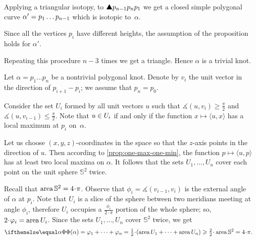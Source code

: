 Applying a triangular isotopy, to $\solidtriangle p_{n-1}p_np_1$ we get a closed simple polygonal curve $\alpha'\z=p_1\dots p_{n-1}$ which is isotopic to~$\alpha$.

Since all the vertices $p_i$ have different heights,
the assumption of the proposition holds for $\alpha'$.

Repeating this procedure $n-3$ times we get a triangle.
Hence $\alpha$ is a trivial knot.
\qeds


Let $\alpha=p_1\dots p_n$ be a nontrivial polygonal knot.
Denote by $v_i$ the unit vector in the direction of $p_{i+1}-p_i$;
we assume that $p_n=p_0$.

Consider the set $U_i$ formed by all unit vectors $u$ such that $\measuredangle(u,v_i)\ge \tfrac \pi 2$ and $\measuredangle(u,v_{i-1})\le \tfrac \pi 2$.
Note that $u\z\in U_i$ if and only if the function $x\mapsto \langle u,x\rangle$ has a local maximum at $p_i$ on~$\alpha$.

Let us choose $(x,y,z)$-coordinates in the space so that the $z$-axis points in the direction of $u$.
Then according to \ref{prop:one-max-one-min}, the function $p\mapsto \langle u,p\rangle$ has at least two local maxima on $\alpha$.
It follows that the sets $U_1,\dots,U_n$ cover each point on the unit sphere $\mathbb{S}^2$ twice.

Recall that $\area \mathbb{S}^2=4\cdot\pi$.
Observe that $\phi_i=\measuredangle(v_{i-1},v_i)$ is the external angle of $\alpha$ at $p_i$.
Note that $U_i$ is a slice of the sphere between two meridians meeting at angle $\phi_i$, therefore $U_i$ occupies a $\tfrac{\phi_i}{2\cdot\pi}$ portion of the whole sphere; so, $2\cdot \phi_i=\area U_i$.
Since the sets $U_1, \dots, U_n$ cover $\mathbb{S}^2$ twice, we get
\[\tc\alpha=\phi_1+\dots+\phi_n=\tfrac12\cdot (\area U_1+\dots+\area U_n)\ge \tfrac22\cdot \area\mathbb{S}^2=4\cdot\pi.\]
\qedsf



